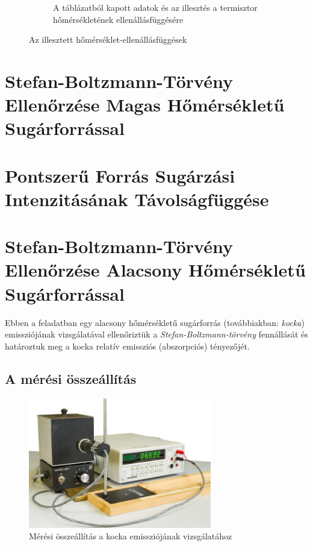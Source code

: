 \documentclass[a4paper, 12pt]{article}
\begin{document}
\begin{figure}[H]
\begin{subfigure}[b]{0.49\textwidth}
            \caption{A táblázatból kapott adatok és az illesztés a termisztor hőmérsékletének ellenállásfüggésére}
            \label{fig:1term}
        \end{subfigure}
        \caption{Az illesztett hőmérséklet-ellenállásfüggések}
        \label{fig:1ill}
    \end{figure}

    \section[Magas Hőmérsékletű Sugárforrás]{Stefan-Boltzmann-Törvény Ellenőrzése Magas Hőmérsékletű Sugárforrással}
    
    \section[Intenzitás Távolságfüggése]{Pontszerű Forrás Sugárzási Intenzitásának Távolságfüggése}
    
    \section[Alacsony Hőmérsékletű Sugárforrás]{Stefan-Boltzmann-Törvény Ellenőrzése Alacsony Hőmérsékletű Sugárforrással}
    Ebben a feladatban egy alacsony hőmérsékletű sugárforrás (továbbiakban: \textit{kocka}) emissziójának vizsgálatával ellenőriztük a \textit{Stefan-Boltzmann-törvény} fennállását és határoztuk meg a kocka relatív emissziós (abszorpciós) tényezőjét.

    \subsection{A mérési összeállítás}
    \begin{figure}[H]
        \centering
        \includegraphics[width=8cm]{632px-Homsug5}
        \caption{Mérési összeállítás a kocka emissziójának vizsgálatához}
        \label{fig:4ossze}
    \end{figure}
\end{document}
